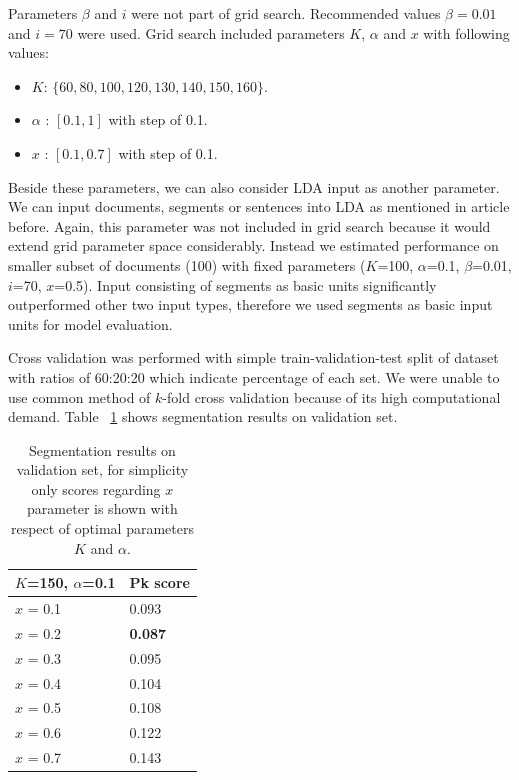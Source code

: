 \documentclass[10pt, a4paper]{article}
\begin{document}
Parameters $\beta$ and $i$ were not part of grid search. Recommended values $\beta = 0.01$ and $i = 70$ were used. Grid search included parameters $K$, $\alpha$ and $x$ with following values:

\begin{itemize}
\item $K$: $\{60, 80, 100, 120, 130, 140, 150, 160\}$.
\item $\alpha$ : $[0.1, 1]$ with step of 0.1.
\item $x$ : $[0.1, 0.7]$ with step of 0.1. 
\end{itemize}

Beside these parameters, we can also consider LDA input as another parameter. We can input documents, segments or sentences into LDA as mentioned in article before. Again, this parameter was not included in grid search because it would extend grid parameter space considerably. Instead we estimated performance on smaller subset of documents (100) with fixed parameters ($K$=100, $\alpha$=0.1, $\beta$=0.01, $i$=70, $x$=0.5). Input consisting of segments as basic units significantly outperformed other two input types, therefore we used segments as basic input units for model evaluation.

Cross validation was performed with simple train-validation-test split of dataset with ratios of 60:20:20 which indicate percentage of each set. We were unable to use common method of $k$-fold cross validation because of its high computational demand. Table ~\ref{tab:narrow-table} shows segmentation results on validation set.

\begin{table}
\caption{Segmentation results on validation set, for simplicity only scores regarding $x$ parameter is shown with respect of optimal parameters $K$ and $\alpha$.}
\label{tab:narrow-table}
\begin{center}
\begin{tabular}{ll}
\toprule
$K$=150, $\alpha$=0.1 & Pk score \\ 
\midrule
{$x$ = 0.1} & {0.093} \\
{$x$ = 0.2} & \textbf{0.087} \\
{$x$ = 0.3} &{0.095} \\ 
{$x$ = 0.4} & {0.104} \\ 
{$x$ = 0.5} & {0.108} \\ 
{$x$ = 0.6} & {0.122} \\
{$x$ = 0.7} & {0.143} \\ 
\bottomrule
\end{tabular}
\end{center}
\end{table}
\end{document}
